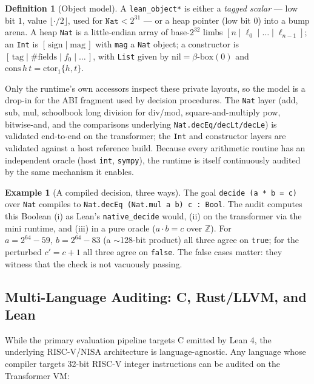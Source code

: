 \documentclass[11pt]{article}
\theoremstyle{definition}
\newtheorem{definition}{Definition}
\newtheorem{example}{Example}
\theoremstyle{plain}
\theoremstyle{remark}
\newcommand{\Z}{\mathbb{Z}}
\begin{document}
\begin{definition}[Object model]
A \texttt{lean\_object*} is either a \emph{tagged scalar} --- low bit $1$, value $\lfloor \cdot/2\rfloor$,
used for $\texttt{Nat} < 2^{31}$ --- or a heap pointer (low bit $0$) into a bump arena. A heap
\texttt{Nat} is a little-endian array of base-$2^{32}$ limbs $[n \mid \ell_0 \mid \dots \mid \ell_{n-1}]$;
an \texttt{Int} is $[\,\mathrm{sign} \mid \mathrm{mag}\,]$ with \texttt{mag} a \texttt{Nat} object; a
constructor is $[\,\mathrm{tag} \mid \#\text{fields} \mid f_0 \mid \dots\,]$, with \texttt{List} given by
$\mathrm{nil}=\beta\text{-box}(0)$ and $\mathrm{cons}\,h\,t = \text{ctor}_1\{h,t\}$.
\end{definition}

Only the runtime's own accessors inspect these private layouts, so the model is a drop-in for the ABI
fragment used by decision procedures. The \texttt{Nat} layer (add, sub, mul, schoolbook long division
for div/mod, square-and-multiply pow, bitwise-and, and the comparisons underlying
\texttt{Nat.decEq/decLt/decLe}) is validated end-to-end on the transformer; the \texttt{Int} and
constructor layers are validated against a host reference build. Because every arithmetic routine has an
independent oracle (host \texttt{int}, \texttt{sympy}), the runtime is itself continuously audited by the
same mechanism it enables.

\begin{example}[A compiled decision, three ways]
The goal \texttt{decide (a * b = c)} over \texttt{Nat} compiles to
\texttt{Nat.decEq (Nat.mul a b) c : Bool}. The audit computes this Boolean (i) as Lean's
\texttt{native\_decide} would, (ii) on the transformer via the mini runtime, and (iii) in a pure oracle
($a\cdot b = c$ over $\Z$). For $a=2^{64}{-}59,\ b=2^{64}{-}83$ (a $\sim$128-bit product) all three agree
on \texttt{true}; for the perturbed $c'=c{+}1$ all three agree on \texttt{false}. The false cases matter:
they witness that the check is not vacuously passing.
\end{example}

\subsection{Multi-Language Auditing: C, Rust/LLVM, and Lean}
While the primary evaluation pipeline targets C emitted by Lean 4, the underlying RISC-V/NISA architecture is language-agnostic. Any language whose compiler targets 32-bit RISC-V integer instructions can be audited on the Transformer VM:
\end{document}

